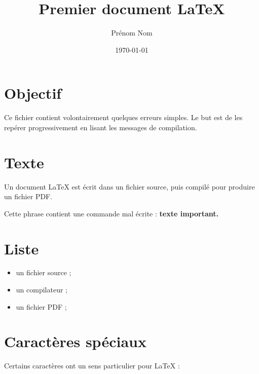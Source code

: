 \documentclass{article}
\title{Premier document LaTeX}
\author{Prénom Nom}
\date{\today}
\begin{document}
\maketitle

\section{Objectif}

Ce fichier contient volontairement quelques erreurs simples. Le but est de les
repérer progressivement en lisant les messages de compilation.

\section{Texte}

Un document LaTeX est écrit dans un fichier source, puis compilé pour produire
un fichier PDF.

Cette phrase contient une commande mal écrite : \textbf{texte important.}

\section{Liste}

\begin{itemize}
  \item un fichier source ;
  \item un compilateur ;
  \item un fichier PDF ;
\end{itemize}

\section{Caractères spéciaux}

Certains caractères ont un sens particulier pour LaTeX : %
\end{document}
